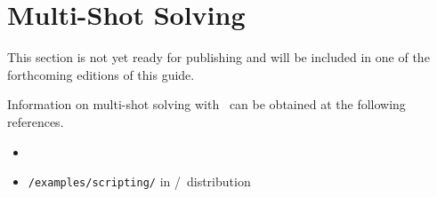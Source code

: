 \section{Multi-Shot Solving}\label{sec:multi}

This section is not yet ready for publishing
and will be included in one of the forthcoming editions of this guide.

Information on multi-shot solving with \clingo\ can be obtained at the following references.

\begin{itemize}
\item \cite{gekakasc14b}
\item \texttt{/examples/scripting/} in \gringo/\clingo\ distribution
\end{itemize}

